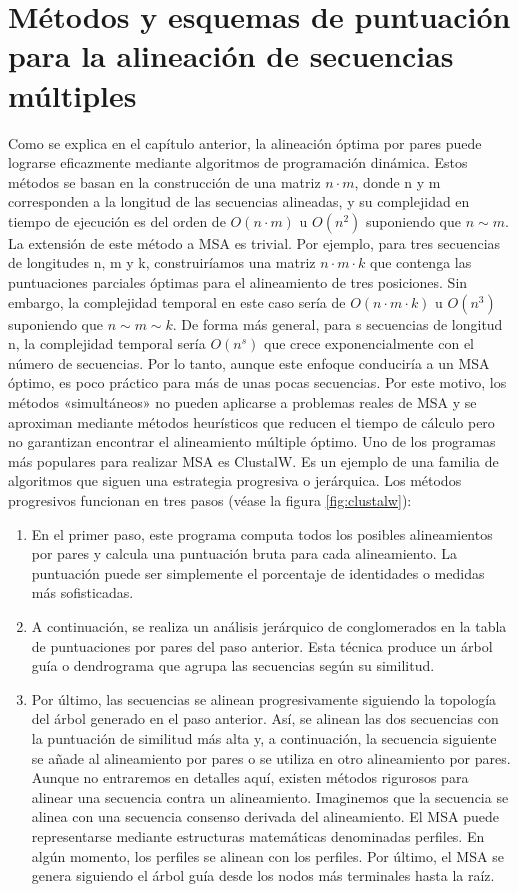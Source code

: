 \section{Métodos y esquemas de puntuación para la alineación de secuencias múltiples}
Como se explica en el capítulo anterior, la alineación óptima por pares puede lograrse eficazmente mediante algoritmos de programación dinámica. Estos métodos se basan en la construcción de una matriz $n \cdot m$, donde n y m corresponden a la longitud de las secuencias alineadas, y su complejidad en tiempo de ejecución es del orden de $O(n \cdot m)$ u $O(n^2)$ suponiendo que $n \sim m$. La extensión de este método a MSA es trivial. Por ejemplo, para tres secuencias de longitudes n, m y k, construiríamos una matriz $n \cdot m \cdot k$ que contenga las puntuaciones parciales óptimas para el alineamiento de tres posiciones. Sin embargo, la complejidad temporal en este caso sería de $O(n \cdot m \cdot k)$ u $O(n^3)$ suponiendo que $n \sim m \sim k$. De forma más general, para s secuencias de longitud n, la complejidad temporal sería $O(n^s)$ que crece exponencialmente con el número de secuencias. Por lo tanto, aunque este enfoque conduciría a un MSA óptimo, es poco práctico para más de unas pocas secuencias. Por este motivo, los métodos «simultáneos» no pueden aplicarse a problemas reales de MSA y se aproximan mediante métodos heurísticos que reducen el tiempo de cálculo pero no garantizan encontrar el alineamiento múltiple óptimo. Uno de los programas más populares para realizar MSA es ClustalW. Es un ejemplo de una familia de algoritmos que siguen una estrategia progresiva o jerárquica. Los métodos progresivos funcionan en tres pasos (véase la figura \ref{fig:clustalw}):
\begin{enumerate}
\item En el primer paso, este programa computa todos los posibles alineamientos por pares y calcula una puntuación bruta para cada alineamiento. La puntuación puede ser simplemente el porcentaje de identidades o medidas más sofisticadas.
\item A continuación, se realiza un análisis jerárquico de conglomerados en la tabla de puntuaciones por pares del paso anterior. Esta técnica produce un árbol guía o dendrograma que agrupa las secuencias según su similitud.
\item Por último, las secuencias se alinean progresivamente siguiendo la topología del árbol generado en el paso anterior. Así, se alinean las dos secuencias con la puntuación de similitud más alta y, a continuación, la secuencia siguiente se añade al alineamiento por pares o se utiliza en otro alineamiento por pares. Aunque no entraremos en detalles aquí, existen métodos rigurosos para alinear una secuencia contra un alineamiento. Imaginemos que la secuencia se alinea con una secuencia consenso derivada del alineamiento. El MSA puede representarse mediante estructuras matemáticas denominadas perfiles. En algún momento, los perfiles se alinean con los perfiles. Por último, el MSA se genera siguiendo el árbol guía desde los nodos más terminales hasta la raíz.
\end{enumerate}

